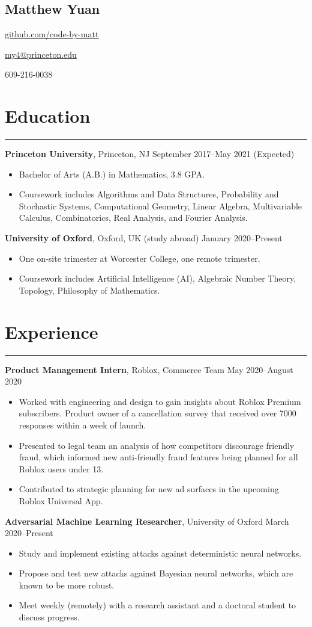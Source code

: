 \documentclass[10pt]{article}
\newcommand{\name}[1]{\begin{center}\section*{\huge #1}\end{center}}
\newcommand{\topinfo}[1]{\begin{center}\vspace{-0.2cm}#1\vspace{-0.2cm}\end{center}}
\newcommand{\resumesection}[1]{\vspace{-0.2cm}\section*{#1}\vspace{-0.2cm}\hrule\vspace{0.2cm}}
\begin{document}
\name{Matthew Yuan}
\topinfo{\href{https://github.com/code-by-matt}{github.com/code-by-matt}}
\topinfo{\href{mailto:my4@princeton.edu}{my4@princeton.edu}}
\topinfo{609-216-0038}

\resumesection{Education}

\textbf{Princeton University}, Princeton, NJ \hfill September 2017--May 2021 (Expected)
\begin{itemize}
	\item Bachelor of Arts (A.B.) in Mathematics, 3.8 GPA.
	\item Coursework includes Algorithms and Data Structures, Probability and Stochastic Systems, Computational Geometry, Linear Algebra, Multivariable Calculus, Combinatorics, Real Analysis, and Fourier Analysis.
\end{itemize}

\textbf{University of Oxford}, Oxford, UK (study abroad) \hfill January 2020--Present
\begin{itemize}
	\item One on-site trimester at Worcester College, one remote trimester.
	\item Coursework includes Artificial Intelligence (AI), Algebraic Number Theory, Topology, Philosophy of Mathematics.
\end{itemize}

\resumesection{Experience}

\textbf{Product Management Intern}, Roblox, Commerce Team \hfill May 2020--August 2020
\begin{itemize}
	\item Worked with engineering and design to gain insights about Roblox Premium subscribers. Product owner of a cancellation survey that received over 7000 responses within a week of launch.
	\item Presented to legal team an analysis of how competitors discourage friendly fraud, which informed new anti-friendly fraud features being planned for all Roblox users under 13.
	\item Contributed to strategic planning for new ad surfaces in the upcoming Roblox Universal App.
\end{itemize}

\textbf{Adversarial Machine Learning Researcher}, University of Oxford \hfill March 2020--Present
\begin{itemize}
	\item Study and implement existing attacks against deterministic neural networks.
	\item Propose and test new attacks against Bayesian neural networks, which are known to be more robust.
	\item Meet weekly (remotely) with a research assistant and a doctoral student to discuss progress.
\end{itemize}
\end{document}
